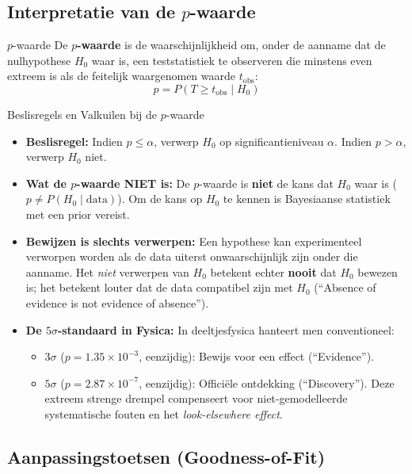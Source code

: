 \documentclass[11pt,a4paper]{article}
\begin{document}
\subsection{Interpretatie van de \texorpdfstring{$p$}{p}-waarde}
\begin{defbox}{$p$-waarde}
De \textbf{$p$-waarde} is de waarschijnlijkheid om, onder de aanname dat de nulhypothese $H_0$ waar is, een teststatistiek te observeren die minstens even extreem is als de feitelijk waargenomen waarde $t_{\text{obs}}$:
\begin{equation}
    p = P(T \ge t_{\text{obs}} \mid H_0)
\end{equation}
\end{defbox}

\begin{theobox}{Beslisregels en Valkuilen bij de $p$-waarde}
\begin{itemize}[leftmargin=1.2em]
    \item \textbf{Beslisregel:} Indien $p \le \alpha$, verwerp $H_0$ op significantieniveau $\alpha$. Indien $p > \alpha$, verwerp $H_0$ niet.
    \item \textbf{Wat de $p$-waarde NIET is:} De $p$-waarde is \textbf{niet} de kans dat $H_0$ waar is ($p \neq P(H_0 \mid \text{data})$). Om de kans op $H_0$ te kennen is Bayesiaanse statistiek met een prior vereist.
    \item \textbf{Bewijzen is slechts verwerpen:} Een hypothese kan experimenteel verworpen worden als de data uiterst onwaarschijnlijk zijn onder die aanname. Het \emph{niet} verwerpen van $H_0$ betekent echter \textbf{nooit} dat $H_0$ bewezen is; het betekent louter dat de data compatibel zijn met $H_0$ (``Absence of evidence is not evidence of absence'').
    \item \textbf{De $5\sigma$-standaard in Fysica:}
    In deeltjesfysica hanteert men conventioneel:
    \begin{itemize}
        \item $3\sigma$ ($p = 1.35 \times 10^{-3}$, eenzijdig): Bewijs voor een effect (``Evidence'').
        \item $5\sigma$ ($p = 2.87 \times 10^{-7}$, eenzijdig): Officiële ontdekking (``Discovery''). Deze extreem strenge drempel compenseert voor niet-gemodelleerde systematische fouten en het \emph{look-elsewhere effect}.
    \end{itemize}
\end{itemize}
\end{theobox}

\subsection{Aanpassingstoetsen (Goodness-of-Fit)}
\end{document}
